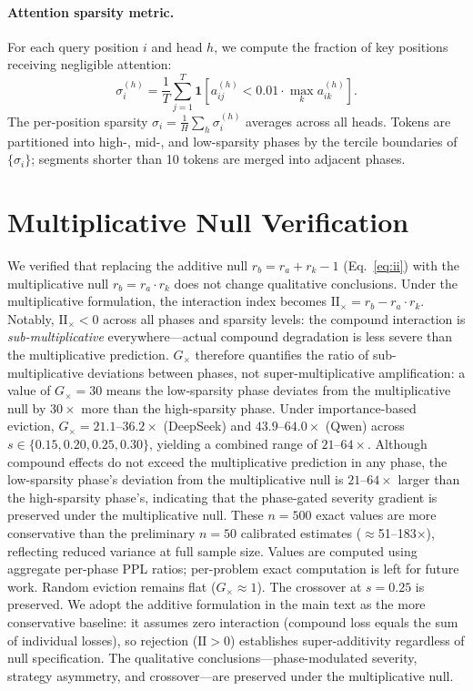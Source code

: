 \paragraph{Attention sparsity metric.}
For each query position $i$ and head $h$, we compute the fraction of key positions receiving negligible attention:
\begin{equation}
    \sigma_i^{(h)} = \frac{1}{T} \sum_{j=1}^{T} \mathbf{1}\!\left[a_{ij}^{(h)} < 0.01 \cdot \max_k a_{ik}^{(h)}\right].
    \label{eq:attn-sparsity}
\end{equation}
The per-position sparsity $\sigma_i = \frac{1}{H}\sum_h \sigma_i^{(h)}$ averages across all heads. Tokens are partitioned into high-, mid-, and low-sparsity phases by the tercile boundaries of $\{\sigma_i\}$; segments shorter than 10 tokens are merged into adjacent phases.

\section{Multiplicative Null Verification}
\label{app:multiplicative-null}

We verified that replacing the additive null $r_b = r_a + r_k - 1$ (Eq.~\ref{eq:ii}) with the multiplicative null $r_b = r_a \cdot r_k$ does not change qualitative conclusions. Under the multiplicative formulation, the interaction index becomes $\mathrm{II}_{\times} = r_b - r_a \cdot r_k$. Notably, $\mathrm{II}_{\times} < 0$ across all phases and sparsity levels: the compound interaction is \emph{sub-multiplicative} everywhere---actual compound degradation is less severe than the multiplicative prediction. $G_{\times}$ therefore quantifies the ratio of sub-multiplicative deviations between phases, not super-multiplicative amplification: a value of $G_{\times}{=}30$ means the low-sparsity phase deviates from the multiplicative null by $30{\times}$ more than the high-sparsity phase. Under importance-based eviction, $G_{\times}{=}21.1$--$36.2{\times}$ (DeepSeek) and $43.9$--$64.0{\times}$ (Qwen) across $s \in \{0.15, 0.20, 0.25, 0.30\}$, yielding a combined range of $21$--$64{\times}$. Although compound effects do not exceed the multiplicative prediction in any phase, the low-sparsity phase's deviation from the multiplicative null is $21$--$64{\times}$ larger than the high-sparsity phase's, indicating that the phase-gated severity gradient is preserved under the multiplicative null. These $n{=}500$ exact values are more conservative than the preliminary $n{=}50$ calibrated estimates ($\approx$51--183${\times}$), reflecting reduced variance at full sample size. Values are computed using aggregate per-phase PPL ratios; per-problem exact computation is left for future work. Random eviction remains flat ($G_{\times} \approx 1$). The crossover at $s{=}0.25$ is preserved. We adopt the additive formulation in the main text as the more conservative baseline: it assumes zero interaction (compound loss equals the sum of individual losses), so rejection ($\mathrm{II} > 0$) establishes super-additivity regardless of null specification. The qualitative conclusions---phase-modulated severity, strategy asymmetry, and crossover---are preserved under the multiplicative null.

